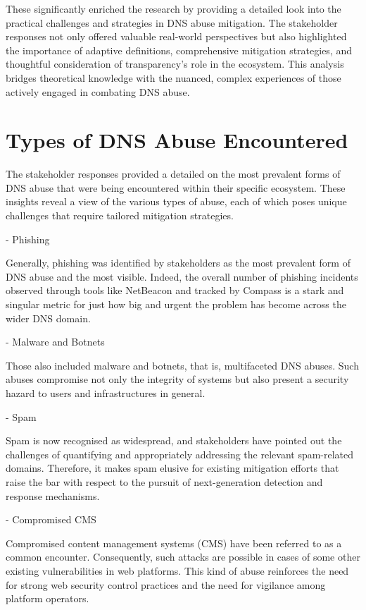  These significantly enriched the research by providing a detailed look into the practical challenges and strategies in DNS abuse mitigation. The stakeholder responses not only offered valuable real-world perspectives but also highlighted the importance of adaptive definitions, comprehensive mitigation strategies, and thoughtful consideration of transparency's role in the ecosystem. This analysis bridges theoretical knowledge with the nuanced, complex experiences of those actively engaged in combating DNS abuse.

\section{Types of DNS Abuse Encountered} 

The stakeholder responses provided a detailed on the most prevalent forms of DNS abuse that were being encountered within their specific ecosystem. These insights reveal a view of the various types of abuse, each of which poses unique challenges that require tailored mitigation strategies.

- Phishing 

Generally, phishing was identified by stakeholders as the most prevalent form of DNS abuse and the most visible. Indeed, the overall number of phishing incidents observed through tools like NetBeacon and tracked by Compass is a stark and singular metric for just how big and urgent the problem has become across the wider DNS domain.

- Malware and Botnets

Those also included malware and botnets, that is, multifaceted DNS abuses. Such abuses compromise not only the integrity of systems but also present a security hazard to users and infrastructures in general.

- Spam

Spam is now recognised as widespread, and stakeholders have pointed out the challenges of quantifying and appropriately addressing the relevant spam-related domains. Therefore, it makes spam elusive for existing mitigation efforts that raise the bar with respect to the pursuit of next-generation detection and response mechanisms.

- Compromised CMS

Compromised content management systems (CMS) have been referred to as a common encounter. Consequently, such attacks are possible in cases of some other existing vulnerabilities in web platforms. This kind of abuse reinforces the need for strong web security control practices and the need for vigilance among platform operators.


